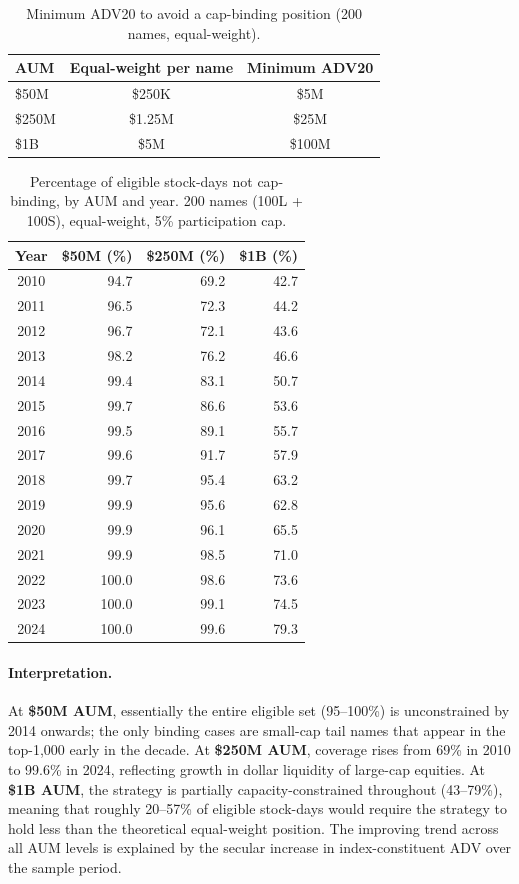 \documentclass[12pt,a4paper]{article}
\begin{document}
\begin{table}[H]
\centering
\caption{Minimum ADV20 to avoid a cap-binding position (200 names, equal-weight).}
\label{tab:aum_threshold}
\begin{tabular}{lcc}
\toprule
AUM & Equal-weight per name & Minimum ADV20 \\
\midrule
\$50M  & \$250K  & \$5M \\
\$250M & \$1.25M & \$25M \\
\$1B   & \$5M    & \$100M \\
\bottomrule
\end{tabular}
\end{table}

\begin{table}[H]
\centering
\caption{Percentage of eligible stock-days not cap-binding, by AUM and year.
         200 names (100L + 100S), equal-weight, 5\% participation cap.}
\label{tab:aum_eligible}
\begin{tabular}{crrr}
\toprule
Year & \$50M (\%) & \$250M (\%) & \$1B (\%) \\
\midrule
2010 &  94.7 &  69.2 &  42.7 \\
2011 &  96.5 &  72.3 &  44.2 \\
2012 &  96.7 &  72.1 &  43.6 \\
2013 &  98.2 &  76.2 &  46.6 \\
2014 &  99.4 &  83.1 &  50.7 \\
2015 &  99.7 &  86.6 &  53.6 \\
2016 &  99.5 &  89.1 &  55.7 \\
2017 &  99.6 &  91.7 &  57.9 \\
2018 &  99.7 &  95.4 &  63.2 \\
2019 &  99.9 &  95.6 &  62.8 \\
2020 &  99.9 &  96.1 &  65.5 \\
2021 &  99.9 &  98.5 &  71.0 \\
2022 & 100.0 &  98.6 &  73.6 \\
2023 & 100.0 &  99.1 &  74.5 \\
2024 & 100.0 &  99.6 &  79.3 \\
\bottomrule
\end{tabular}
\end{table}

\paragraph{Interpretation.}
At \textbf{\$50M AUM}, essentially the entire eligible set (95--100\%) is
unconstrained by 2014 onwards; the only binding cases are small-cap tail names
that appear in the top-1,000 early in the decade.
At \textbf{\$250M AUM}, coverage rises from 69\% in 2010 to 99.6\% in 2024,
reflecting growth in dollar liquidity of large-cap equities.
At \textbf{\$1B AUM}, the strategy is partially capacity-constrained throughout
(43--79\%), meaning that roughly 20--57\% of eligible stock-days would require
the strategy to hold less than the theoretical equal-weight position.
The improving trend across all AUM levels is explained by the secular increase
in index-constituent ADV over the sample period.
\end{document}
